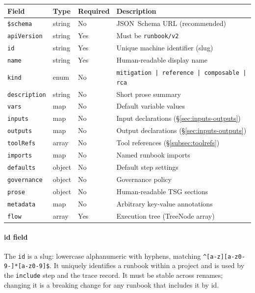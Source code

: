 \begin{center}
\begin{tabular}{lllp{5.5cm}}
\hline
\textbf{Field} & \textbf{Type} & \textbf{Required} & \textbf{Description} \\
\hline
\texttt{\$schema}     & string  & No  & JSON~Schema URL (recommended) \\
\texttt{apiVersion}   & string  & Yes & Must be \texttt{runbook/v2} \\
\texttt{id}           & string  & Yes & Unique machine identifier (slug) \\
\texttt{name}         & string  & Yes & Human-readable display name \\
\texttt{kind}         & enum    & No  & \texttt{mitigation | reference | composable | rca} \\
\texttt{description}  & string  & No  & Short prose summary \\
\texttt{vars}         & map     & No  & Default variable values \\
\texttt{inputs}       & map     & No  & Input declarations (\S\ref{sec:inputs-outputs}) \\
\texttt{outputs}      & map     & No  & Output declarations (\S\ref{sec:inputs-outputs}) \\
\texttt{toolRefs}     & array   & No  & Tool references (\S\ref{subsec:toolrefs}) \\
\texttt{imports}      & map     & No  & Named runbook imports \\
\texttt{defaults}     & object  & No  & Default step settings \\
\texttt{governance}   & object  & No  & Governance policy \\
\texttt{prose}        & object  & No  & Human-readable TSG sections \\
\texttt{metadata}     & map     & No  & Arbitrary key-value annotations \\
\texttt{flow}         & array   & Yes & Execution tree (TreeNode array) \\
\hline
\end{tabular}
\end{center}

\paragraph{id field}
The \texttt{id} is a slug: lowercase alphanumeric with hyphens, matching
\texttt{\^{}[a-z][a-z0-9-]*[a-z0-9]\$}.  It uniquely identifies a runbook within
a project and is used by the \texttt{include} step and the trace record.  It must
be stable across renames; changing it is a breaking change for any runbook that
includes it by id.

